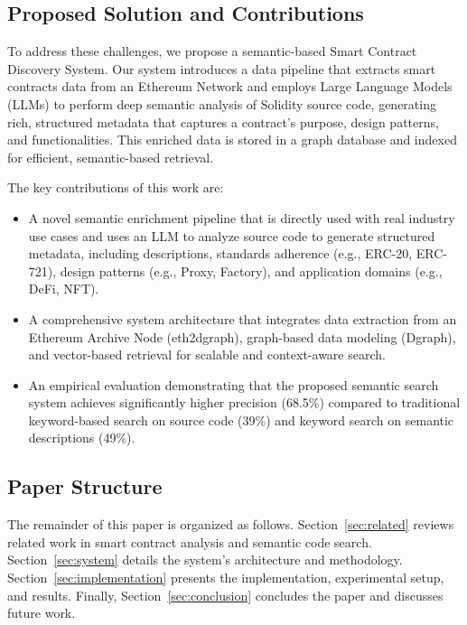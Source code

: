 \subsection{Proposed Solution and Contributions}
To address these challenges, we propose a semantic-based Smart Contract Discovery System. Our system introduces a data pipeline that extracts smart contracts data from an Ethereum Network and employs Large Language Models (LLMs) to perform deep semantic analysis of Solidity source code, generating rich, structured metadata that captures a contract's purpose, design patterns, and functionalities. This enriched data is stored in a graph database and indexed for efficient, semantic-based retrieval.

The key contributions of this work are:
\begin{itemize}
	\item A novel semantic enrichment pipeline that is directly used with real industry use cases and uses an LLM to analyze source code to generate structured metadata, including descriptions, standards adherence (e.g., ERC-20, ERC-721), design patterns (e.g., Proxy, Factory), and application domains (e.g., DeFi, NFT).
	\item A comprehensive system architecture that integrates data extraction from an Ethereum Archive Node (eth2dgraph), graph-based data modeling (Dgraph), and vector-based retrieval for scalable and context-aware search.
	\item An empirical evaluation demonstrating that the proposed semantic search system achieves significantly higher precision (68.5\%) compared to traditional keyword-based search on source code (39\%) and keyword search on semantic descriptions (49\%).
\end{itemize}

\subsection{Paper Structure}
The remainder of this paper is organized as follows. Section~\ref{sec:related} reviews related work in smart contract analysis and semantic code search. Section~\ref{sec:system} details the system's architecture and methodology. Section~\ref{sec:implementation} presents the implementation, experimental setup, and results. Finally, Section~\ref{sec:conclusion} concludes the paper and discusses future work.